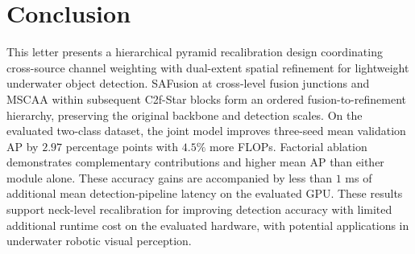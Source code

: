 \documentclass[letterpaper,10pt,conference]{ieeeconf}
\begin{document}
\section{Conclusion}
This letter presents a hierarchical pyramid recalibration design
coordinating cross-source channel weighting with dual-extent spatial
refinement for lightweight underwater object detection.
SAFusion at cross-level fusion junctions and MSCAA within subsequent
C2f-Star blocks form an ordered fusion-to-refinement hierarchy,
preserving the original backbone and detection scales.
On the evaluated two-class dataset, the joint model improves
three-seed mean validation AP by \(2.97\) percentage points
with \(4.5\%\) more FLOPs.
Factorial ablation demonstrates complementary contributions
and higher mean AP than either module alone.
These accuracy gains are accompanied by less than \(1\) ms
of additional mean detection-pipeline latency on the evaluated GPU.
These results support neck-level recalibration for improving
detection accuracy with limited additional runtime cost on the
evaluated hardware, with potential applications in underwater
robotic visual perception.




\end{document}
